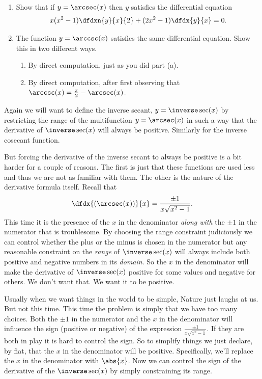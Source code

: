 \begin{embeddedproblem-enumerate}
  \begin{enumerate}[label={\bf{}(\alph*)}]
  \item Show that if $y=\arcsec(x)$ then $y$ satisfies the
    differential equation
    $$
    x(x^2-1)\dfdxn{y}{x}{2}+(2x^2-1)\dfdx{y}{x}=0.
    $$
  \item The function   $y=\arccsc(x)$ satisfies the same differential
    equation. Show this in two different ways.
    \begin{enumerate}[label={\bf{}(\roman*)}]{}
    \item By direct computation, just as you did part (a).
    \item By direct computation, after first observing that $\arccsc(x)=\frac\pi2-\arcsec(x)$.
    \end{enumerate}
  \end{enumerate}{}
\end{embeddedproblem-enumerate}


Again we will want to define the inverse secant, $y=\inverse\sec(x)$
by restricting the range of the multifunction
$y=\arcsec(x)$ in such a way that the derivative of $\inverse\sec(x)$
will always be positive. Similarly for the inverse cosecant function.

But forcing the derivative of the inverse secant to always be positive
is a bit harder for a couple of reasons. The first is just that these
functions are used less and thus we are not as familiar with them.
The other is the nature of the derivative formula itself. Recall that
$$
\dfdx{(\arcsec(x))}{x}=\frac{\pm1}{x\sqrt{x^2-1}}.
$$
This time it is the presence of the $x$ in the denominator \emph{along
  with} the $\pm1$ in the numerator that is troublesome. By choosing
the range constraint judiciously we can control whether the plus or
the minus is chosen in the numerator but any reasonable constraint on
the \emph{range} of $\inverse\sec(x)$ will always include both
positive and negative numbers in its \emph{domain}. So the $x$ in the
denominator will make the derivative of $\inverse\sec(x)$ positive for
some values and negative for others. We don't want that. We want it to
be positive.

Usually when we want things in the world to be simple, Nature just
laughs at us. But not this time. This time the problem is simply that
we have too many choices.  Both the $\pm1$ in the numerator and
the $x$ in the denominator will influence the sign (positive or
negative) of the expression $\frac{\pm1}{x\sqrt{x^2-1}}$. If they are
both in play it is hard to control the sign. So to simplify things we
just declare, by fiat, that the $x$ in the denominator will be
positive.  Specifically, we'll replace the $x$ in the denominator
with $\abs{x}$. Now we can control the sign of the derivative of the
$\inverse\sec(x)$ by simply constraining its range.

